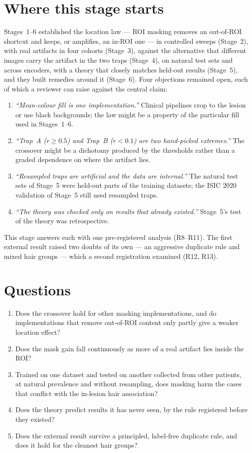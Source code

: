 \section{Where this stage starts}
Stages~1--6 established the location law --- ROI masking removes an out-of-ROI shortcut and keeps, or amplifies, an
in-ROI one --- in controlled sweeps (Stage~2), with real artifacts in four cohorts (Stage~3), against the alternative that
different images carry the artifact in the two traps (Stage~4), on natural test sets and across encoders, with a theory
that closely matches held-out results (Stage~5), and they built remedies around it (Stage~6). Four objections remained
open, each of which a reviewer can raise against the central claim:
\begin{enumerate}[leftmargin=*]\itemsep1pt
\item \emph{``Mean-colour fill is one implementation.''} Clinical pipelines crop to the lesion or use black
backgrounds; the law might be a property of the particular fill used in Stages~1--6.
\item \emph{``Trap~A ($r\ge0.5$) and Trap~B ($r<0.1$) are two hand-picked extremes.''} The crossover might be a
dichotomy produced by the thresholds rather than a graded dependence on where the artifact lies.
\item \emph{``Resampled traps are artificial and the data are internal.''} The natural test sets of Stage~5 were
held-out parts of the training datasets; the ISIC 2020 validation of Stage~5 still used resampled traps.
\item \emph{``The theory was checked only on results that already existed.''} Stage~5's test of the theory was
retrospective.
\end{enumerate}
This stage answers each with one pre-registered analysis (R8--R11). The first external result raised two doubts of
its own --- an aggressive duplicate rule and mixed hair groups --- which a second registration examined (R12, R13).

\section{Questions}
\begin{enumerate}[label=\textbf{Q7\alph*},leftmargin=*]\itemsep1pt
\item Does the crossover hold for other masking implementations, and do implementations that remove out-of-ROI
content only partly give a weaker location effect?
\item Does the mask gain fall continuously as more of a real artifact lies inside the ROI?
\item Trained on one dataset and tested on another collected from other patients, at natural prevalence and without
resampling, does masking harm the cases that conflict with the in-lesion hair association?
\item Does the theory predict results it has never seen, by the rule registered before they existed?
\item Does the external result survive a principled, label-free duplicate rule, and does it hold for the cleanest
hair groups?
\end{enumerate}
